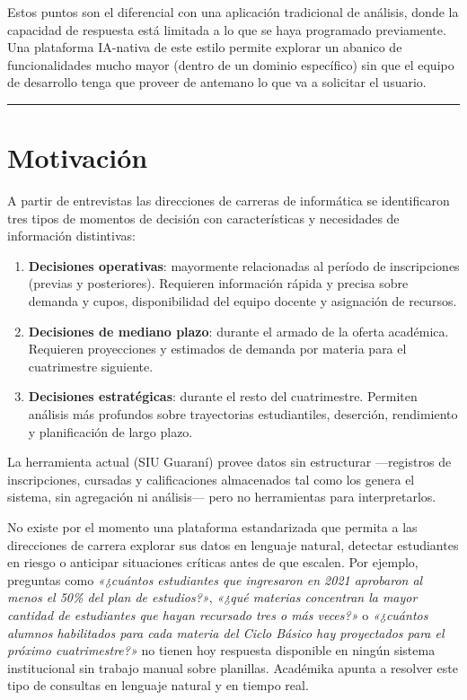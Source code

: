 \documentclass[
  spanish,
]{article}
\begin{document}
Estos puntos son el diferencial con una aplicación tradicional de análisis, donde 
la capacidad de respuesta está limitada a lo que se haya programado previamente.
Una plataforma IA-nativa de este estilo permite explorar un abanico de funcionalidades
mucho mayor (dentro de un dominio específico) sin que el equipo de desarrollo tenga que
proveer de antemano lo que va a solicitar el usuario.

\begin{center}\rule{0.5\linewidth}{0.5pt}\end{center}

\section{Motivación}\label{motivacion}

A partir de entrevistas las direcciones de carreras de informática
se identificaron tres tipos de momentos de decisión con características
y necesidades de información distintivas:

\begin{enumerate}
\def\labelenumi{\arabic{enumi}.}
\item
  \textbf{Decisiones operativas}: mayormente relacionadas al período
  de inscripciones (previas y posteriores). Requieren información rápida
  y precisa sobre demanda y cupos, disponibilidad del equipo docente y
  asignación de recursos.
\item
  \textbf{Decisiones de mediano plazo}: durante el armado de la
  oferta académica. Requieren proyecciones y estimados de demanda por
  materia para el cuatrimestre siguiente.
\item
  \textbf{Decisiones estratégicas}: durante el resto del
  cuatrimestre. Permiten análisis más profundos sobre trayectorias
  estudiantiles, deserción, rendimiento y planificación de largo plazo.
\end{enumerate}

La herramienta actual (SIU Guaraní) provee datos sin estructurar
---registros de inscripciones, cursadas y calificaciones almacenados
tal como los genera el sistema, sin agregación ni análisis---
pero no herramientas para interpretarlos.

No existe por el momento una plataforma estandarizada que permita a las direcciones de
carrera explorar sus datos en lenguaje natural, detectar estudiantes en
riesgo o anticipar situaciones críticas antes de que escalen. Por ejemplo,
preguntas como \textit{«¿cuántos estudiantes que ingresaron en 2021 aprobaron al
menos el 50\% del plan de estudios?»}, \textit{«¿qué materias concentran la mayor cantidad de estudiantes
que hayan recursado tres o más veces?»} o \textit{«¿cuántos alumnos habilitados para cada materia del
Ciclo Básico hay proyectados para el próximo cuatrimestre?»} no tienen hoy respuesta
disponible en ningún sistema institucional sin trabajo manual sobre planillas.
Académika apunta a resolver este tipo de consultas en lenguaje natural y en tiempo real.
\end{document}
